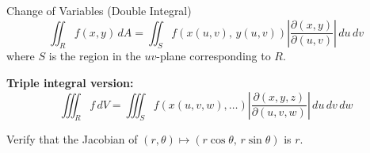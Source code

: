\documentclass[11pt]{article}
\begin{document}
\begin{thmbox}{Change of Variables (Double Integral)}
\[\iint_R f(x,y)\,dA = \iint_S f\!\left(x(u,v),\, y(u,v)\right)\left|\frac{\partial(x,y)}{\partial(u,v)}\right|\,du\,dv\]
where $S$ is the region in the $uv$-plane corresponding to $R$.

\medskip
\textbf{Triple integral version:}
\[\iiint_R f\,dV = \iiint_S f\!\left(x(u,v,w),\ldots\right)\left|\frac{\partial(x,y,z)}{\partial(u,v,w)}\right|\,du\,dv\,dw\]
\end{thmbox}


\begin{example}
Verify that the Jacobian of $(r,\theta) \mapsto (r\cos\theta,\, r\sin\theta)$ is $r$.

\end{example}
\end{document}
